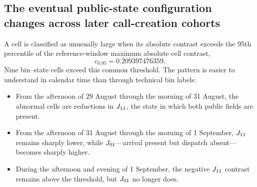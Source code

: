 \documentclass[11pt]{article}
\begin{document}
\subsection{The eventual public-state configuration changes across later call-creation cohorts}

A cell is classified as unusually large when its absolute contrast exceeds the 95th percentile of the reference-window maximum absolute cell contrast,
\begin{equation}
c_{0.95}=0.209397476359.
\end{equation}
Nine bin--state cells exceed this common threshold. The pattern is easier to understand in calendar time than through technical bin labels:

\begin{itemize}
\item From the afternoon of 29 August through the morning of 31 August, the abnormal cells are reductions in $J_{11}$, the state in which both public fields are present.
\item From the afternoon of 31 August through the morning of 1 September, $J_{11}$ remains sharply lower, while $J_{01}$---arrival present but dispatch absent---becomes sharply higher.
\item During the afternoon and evening of 1 September, the negative $J_{11}$ contrast remains above the threshold, but $J_{01}$ no longer does.
\end{itemize}
\end{document}
